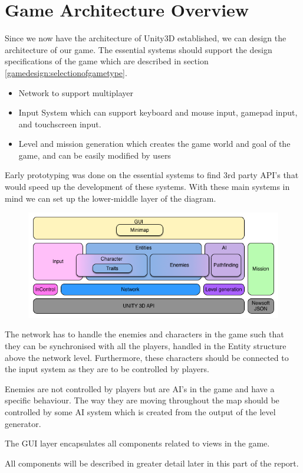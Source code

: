 \section{Game Architecture Overview}
Since we now have the architecture of Unity3D established, we can design the architecture of our game.
The essential systems should support the design specifications of the game which are described in section \ref{gamedesign:selectionofgametype}.
\begin{itemize}
    \item Network to support multiplayer
    \item Input System which can support keyboard and mouse input, gamepad input, and touchscreen input.
    \item Level and mission generation which creates the game world and goal of the game, and can be easily modified by users
\end{itemize}
Early prototyping was done on the essential systems to find 3rd party API's that would speed up the development of these systems.
With these main systems in mind we can set up the lower-middle layer of the diagram.

\begin{figure}
\includegraphics[width = \textwidth]{figures/architecture/game_architecture_overview.png}
\end{figure}

The network has to handle the enemies and characters in the game such that they can be synchronised with all the players, handled in the Entity structure above the network level.
Furthermore, these characters should be connected to the input system as they are to be controlled by players.

Enemies are not controlled by players but are AI's in the game and have a specific behaviour.
The way they are moving throughout the map should be controlled by some AI system which is created from the output of the level generator.

The GUI layer encapsulates all components related to views in the game.

All components will be described in greater detail later in this part of the report.

